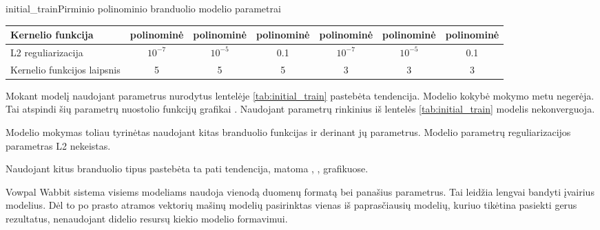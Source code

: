 \begin{ktutable}{initial_train}{Pirminio polinominio branduolio modelio parametrai}
    \begin{tabular}{| l | c | c | c | c | c | c | }
    \hline
        Kernelio funkcija & polinominė & polinominė & polinominė & polinominė & polinominė & polinominė \\ \hline
        L2 reguliarizacija & $10^{-7}$ & $10^{-5}$ & 0.1 & $10^{-7}$ & $10^{-5}$ & 0.1 \\ \hline
        Kernelio funkcijos laipsnis & 5 & 5 & 5 & 3 & 3 & 3 \\ \hline
    \end{tabular}
\end{ktutable}

Mokant modelį naudojant parametrus nurodytus lentelėje \vref{tab:initial_train} pastebėta tendencija.
Modelio kokybė mokymo metu negerėja. Tai atspindi šių parametrų nuostolio funkcijų grafikai
. Naudojant parametrų rinkinius iš lentelės \vref{tab:initial_train}
modelis nekonverguoja.


Modelio mokymas toliau tyrinėtas naudojant kitas branduolio funkcijas ir derinant jų parametrus.
Modelio parametrų reguliarizacijos parametras L2 nekeistas.


Naudojant kitus branduolio tipus pastebėta ta pati tendencija, matoma , ,  grafikuose.


Vowpal Wabbit sistema visiems modeliams naudoja vienodą duomenų formatą bei panašius parametrus.
Tai leidžia lengvai bandyti įvairius modelius. Dėl to po prasto atramos vektorių mašinų modelių
pasirinktas vienas iš paprasčiausių modelių, kuriuo tikėtina pasiekti gerus rezultatus, nenaudojant
didelio resursų kiekio modelio formavimui.

